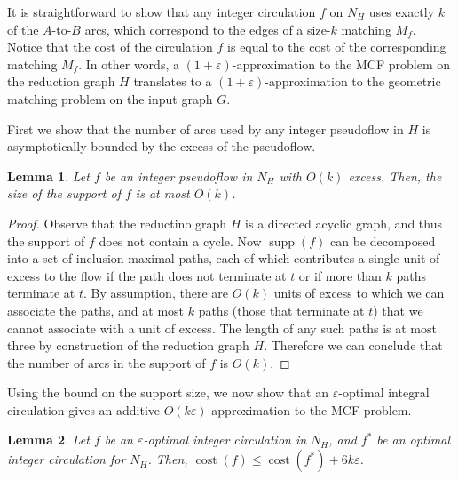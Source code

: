 \documentclass[11pt]{article}
\def\eps{\varepsilon}
\def\cost{\operatorname{cost}}
\def\supp{\operatorname{supp}}
\theoremstyle{plain}
\newtheorem{lemma}{Lemma}[section]
\numberwithin{figure}{section}
\def\EMPH#1{\textbf{\boldmath #1}}
\begin{document}
It is straightforward to show that any integer circulation $f$ on $N_H$ uses exactly
$k$ of the $A$-to-$B$ arcs, which correspond to the edges of a size-$k$
matching \EMPH{$M_f$}.
Notice that the cost of the circulation $f$ is equal to the cost of the corresponding matching $M_f$.
%
In other words, a $(1+\eps)$-approximation to the MCF problem on the reduction graph $H$ translates to a $(1+\eps)$-approximation to the geometric matching problem on the input graph $G$.

First we show that the number of arcs used by any integer pseudoflow
in $H$ is asymptotically bounded by the excess of the pseudoflow.

\begin{lemma}
\label{lemma:reduction_count}
Let $f$ be an integer pseudoflow in $N_H$ with $O(k)$ excess.
Then, the size of the support of $f$ is at most $O(k)$.
\end{lemma}

\begin{proof}
Observe that the reductino graph $H$ is a directed acyclic graph, and thus the support of $f$ does not contain a cycle.
Now $\supp(f)$ can be decomposed into a set of inclusion-maximal paths,
each of which contributes a single unit of excess to the flow if the path does not terminate at $t$ or if more than $k$ paths terminate at $t$.
By assumption, there are $O(k)$ units of excess to which we can associate the
paths, and at most $k$ paths (those that terminate at $t$) that we cannot associate with a unit of excess.
The length of any such paths is at most  three by construction of the reduction graph $H$.
Therefore we can conclude that the number of arcs in the support of $f$ is $O(k)$.
\end{proof}

Using the bound on the support size, we now show that an $\eps$-optimal integral circulation gives an additive $O(k\eps)$-approximation to the MCF problem.

\begin{lemma}
\label{lemma:goldberg_cost_add}
Let $f$ be an $\eps$-optimal integer circulation in $N_H$, and $f^*$ be an optimal integer circulation for $N_H$.
Then, $\cost(f) \leq \cost(f^*) + 6k\eps$.
\end{lemma}
\end{document}
